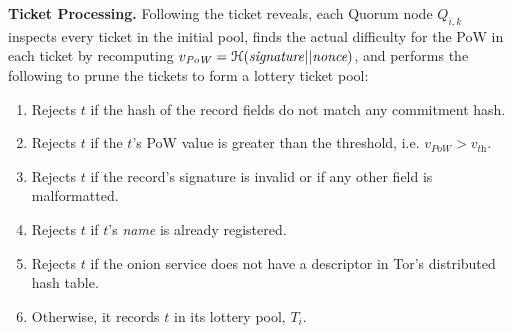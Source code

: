 \documentclass[USenglish,oneside,twocolumn]{article}
\begin{document}

\textbf{Ticket Processing.} Following the ticket reveals, each Quorum node $ Q_{i,k} $ inspects every ticket in the initial pool, finds the actual difficulty for the PoW in each ticket by recomputing $v_{\mathit{PoW}}=\mathcal{H}(\mathit{signature}||\emph{nonce})$, and performs the following to prune the tickets to form a lottery ticket pool:

\begin{enumerate}
	\item Rejects $ t $ if the hash of the record fields do not match any commitment hash.
	\item Rejects $ t $ if the $ t $'s PoW value is greater than the threshold, i.e. $v_{\mathit{PoW}}> v_{\textit{th}}$.
	\item Rejects $ t $ if the record's signature is invalid or if any other field is malformatted.
	\item Rejects $ t $ if $ t $'s \emph{name} is already registered.
	\item Rejects $ t $ if the onion service does not have a descriptor in Tor's distributed hash table.
	\item Otherwise, it records $ t $ in its lottery pool, $ T_{i} $.
\end{enumerate}


\end{document}
